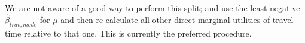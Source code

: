 


We are not aware of a good way to perform this split; \citet{KickhoeferEtAl2011PolicyEvaluationIncome} and \citet{Kickhoefer2014PhD} use the least negative $\hat\beta_{trav,mode}$ for $\mu$ and then re-calculate all other direct marginal utilities of travel time relative to that one.
%
%
This is currently the preferred procedure.
%
%

